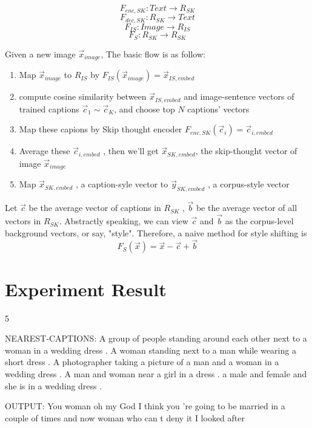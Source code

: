 \documentclass{article}
\begin{document}
	\[ F_{enc,SK} : \textit{Text} \to R_{SK}\]
	\[ F_{dec,SK} : R_{SK} \to \textit{Text}\]
	\[ F_{IS} : \textit{Image} \to R_{IS}\]
	\[ F_S : R_{SK} \to R_{SK}\]
	\newline

	\par Given a new image $\vec{x}_{image}$, The basic flow is as follow:
	\begin{enumerate}
		\item Map $\vec{x}_{image}$ to $R_{IS}$ by $F_{IS}(\vec{x}_{image}) = \vec{x}_{IS,embed}$
		\item compute cosine similarity between $\vec{x}_{IS,embed}$ and image-sentence vectors of trained captions $\vec{c}_1 \sim \vec{c}_K$, and choose top $N$ captions' vectors
		\item Map these capions by Skip thought encoder $F_{enc,SK}(\vec{c}_i) = \vec{c}_{i,embed}$
		\item Average these $\vec{c}_{i,embed}$ , then we'll get $\vec{x}_{SK,embed}$, the skip-thought vector of image $\vec{x}_{image}$
		\item Map $\vec{x}_{SK,embed}$ , a caption-syle vector to $\vec{y}_{SK,embed}$ , a corpus-style vector
	\end{enumerate}

	\par Let $\vec{c}$ be the average vector of captions in $R_{SK}$ , $\vec{b}$ be the average vector of all vectors in $R_{SK}$. Abstractly speaking, we can view $\vec{c}$ and $\vec{b}$ as the corpus-level background vectors, or say, "style". Therefore, a naive method for style shifting is
	\[ F_S(\vec{x}) = \vec{x} - \vec{c} + \vec{b} \]





\section{Experiment Result}

5

NEAREST-CAPTIONS:
A group of people standing around each other next to a woman in a wedding dress .
A woman standing next to a man while wearing a short dress .
A photographer taking a picture of a man and a woman in a wedding dress .
A man and woman near a girl in a dress .
a male and female and she is in a wedding dress .

OUTPUT:
You woman
oh my God
I think you 're going to be married in a couple of times
and now
woman who can t deny it
I looked after 
\end{document}
